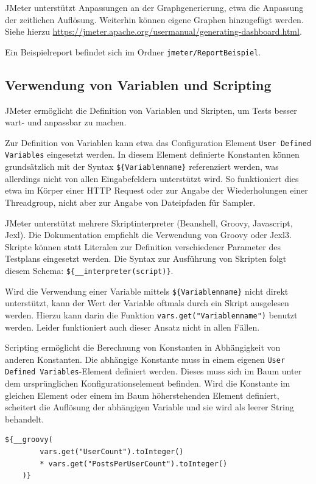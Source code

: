 JMeter unterstützt Anpassungen an der Graphgenerierung, etwa die Anpassung der zeitlichen Auflösung.
Weiterhin können eigene Graphen hinzugefügt werden. 
Siehe hierzu \url{https://jmeter.apache.org/usermanual/generating-dashboard.html}.

Ein Beispielreport befindet sich im Ordner \texttt{jmeter/ReportBeispiel}.



\subsection{Verwendung von Variablen und Scripting}

JMeter ermöglicht die Definition von Variablen und Skripten, um Tests besser wart- und anpassbar zu machen.

Zur Definition von Variablen kann etwa das Configuration Element \texttt{User Defined Variables} eingesetzt werden.
In diesem Element definierte Konstanten können grundsätzlich mit der Syntax \lstinline|${Variablenname}| referenziert werden,
was allerdings nicht von allen Eingabefeldern unterstützt wird.
So funktioniert dies etwa im Körper einer HTTP Request oder zur Angabe der Wiederholungen einer Threadgroup,
nicht aber zur Angabe von Dateipfaden für Sampler.

JMeter unterstützt mehrere Skriptinterpreter (Beanshell, Groovy, Javascript, Jexl). 
Die Dokumentation empfiehlt die Verwendung von Groovy oder Jexl3.
Skripte können statt Literalen zur Definition verschiedener Parameter des Testplans eingesetzt werden.
Die Syntax zur Ausführung von Skripten folgt diesem Schema: \lstinline|${__interpreter(script)}|.

Wird die Verwendung einer Variable mittels \lstinline|${Variablenname}| nicht direkt unterstützt,
kann der Wert der Variable oftmals durch ein Skript ausgelesen werden.
Hierzu kann darin die Funktion \lstinline{vars.get("Variablenname")} benutzt werden.
Leider funktioniert auch dieser Ansatz nicht in allen Fällen.

Scripting ermöglicht die Berechnung von Konstanten in Abhängigkeit von anderen Konstanten.
Die abhängige Konstante muss in einem eigenen \texttt{User Defined Variables}-Element definiert werden.
Dieses muss sich im Baum unter dem ursprünglichen Konfigurationselement befinden.
Wird die Konstante im gleichen Element oder einem im Baum höherstehenden Element definiert,
scheitert die Auflösung der abhängigen Variable und sie wird als leerer String behandelt.

\begin{lstlisting}[caption=Beispiel eines Groovy-Skripts]
    ${__groovy(
        vars.get("UserCount").toInteger() 
        * vars.get("PostsPerUserCount").toInteger()
    )}
    \end{lstlisting}

